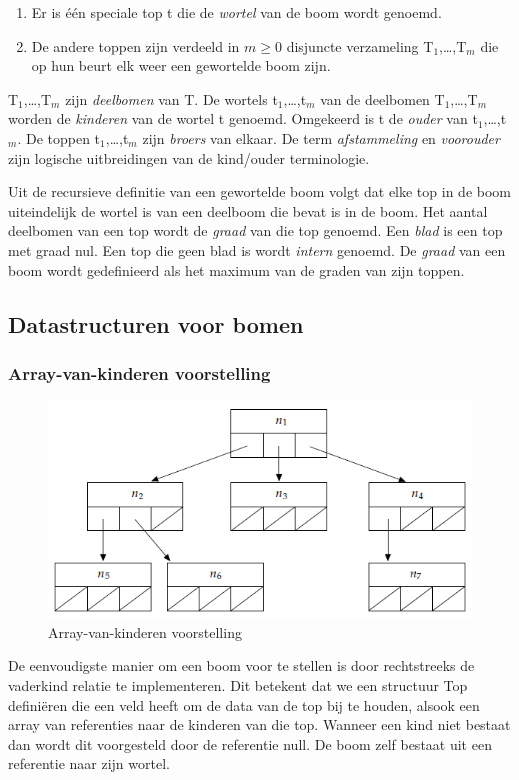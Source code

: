 \documentclass[a4paper,12pt]{article}
\begin{document}
\begin{enumerate}
\item Er is één speciale top t die de \textit{wortel} van de boom wordt genoemd.
\item De andere toppen zijn verdeeld in $m\geq 0$ disjuncte verzameling T$_1$,\dots,T$_m$ die op hun beurt elk weer een gewortelde boom zijn.
\end{enumerate}

T$_1$,\dots,T$_m$ zijn \textit{deelbomen} van T.
De wortels t$_1$,\dots,t$_m$ van de deelbomen T$_1$,\dots,T$_m$ worden de \textit{kinderen} van de wortel t genoemd.
Omgekeerd is t de \textit{ouder} van t$_1$,\dots,t$_m$.
De toppen t$_1$,\dots,t$_m$ zijn \textit{broers} van elkaar.
De term \textit{afstammeling} en \textit{voorouder} zijn logische uitbreidingen van de kind/ouder terminologie.

Uit de recursieve definitie van een gewortelde boom volgt dat elke top in de boom uiteindelijk de wortel is van een deelboom die bevat is in de boom.
Het aantal deelbomen van een top wordt de \textit{graad} van die top genoemd.
Een \textit{blad} is een top met graad nul.
Een top die geen blad is wordt \textit{intern} genoemd.
De \textit{graad} van een boom wordt gedefinieerd als het maximum van de graden van zijn toppen.

\subsection{Datastructuren voor bomen}
\subsubsection{Array-van-kinderen voorstelling}
\begin{figure}[H]
	\centering
	\includegraphics[width=.5\linewidth]{img/Array-van-kinderen}
  	\caption{Array-van-kinderen voorstelling}
  	\label{fig:Array-van-kinderen}
\end{figure}

De eenvoudigste manier om een boom voor te stellen is door rechtstreeks de vaderkind relatie te implementeren.
Dit betekent dat we een structuur Top definiëren die een veld heeft om de data van de top bij te houden, alsook een array van referenties
naar de kinderen van die top.
Wanneer een kind niet bestaat dan wordt dit voorgesteld door de referentie null.
De boom zelf bestaat uit een referentie naar zijn
wortel.
\end{document}

